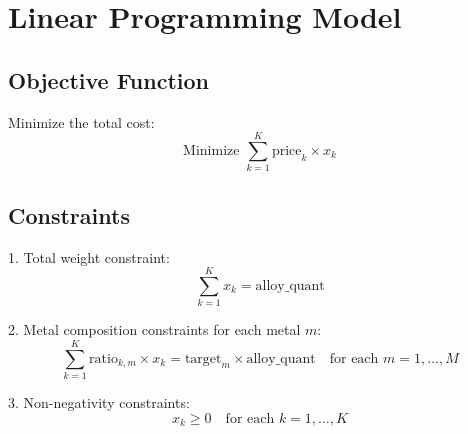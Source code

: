 \documentclass{article}
\begin{document}
\section*{Linear Programming Model}

\subsection*{Objective Function}

Minimize the total cost:
\[
\text{Minimize } \sum_{k=1}^{K} \text{price}_k \times x_k
\]

\subsection*{Constraints}

1. Total weight constraint:
\[
\sum_{k=1}^{K} x_k = \text{alloy\_quant}
\]

2. Metal composition constraints for each metal \( m \):
\[
\sum_{k=1}^{K} \text{ratio}_{k,m} \times x_k = \text{target}_m \times \text{alloy\_quant} \quad \text{for each } m = 1, \ldots, M
\]

3. Non-negativity constraints:
\[
x_k \geq 0 \quad \text{for each } k = 1, \ldots, K
\]
\end{document}
